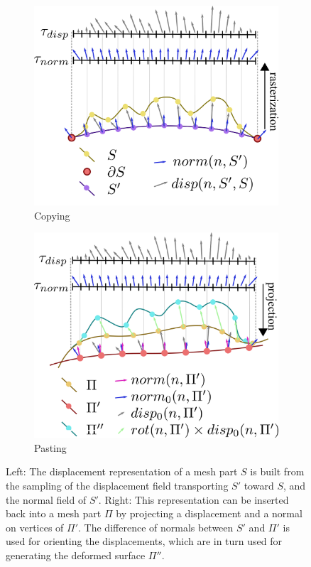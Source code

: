 \begin{figure}[!h]
	\centering
	\begin{subfigure}[b]{0.48\linewidth}
		\centering
		\includegraphics[width=\textwidth]{images/fluidsculpting-mig2016/displacement_copy_2.png}
		\caption{\label{fig:displacement:copy}Copying}
	\end{subfigure}
	\hspace{0.1cm}
	\begin{subfigure}[b]{0.48\linewidth}
		\centering
		\includegraphics[width=\textwidth]{images/fluidsculpting-mig2016/displacement_paste_2.png}
		\caption{\label{fig:displacement:insertion}Pasting}
	\end{subfigure}
	\caption[Fluid sculpting: Copy/Paste]{
		Left: The displacement representation of a mesh part $S$ is built from the sampling of the displacement field transporting $S'$ toward $S$, and the normal field of $S'$.
		Right: This representation can be inserted back into a mesh part $\Pi$ by projecting a displacement and a normal on vertices of $\Pi'$. 
		The difference of normals between $S'$ and $\Pi'$ is used for orienting the displacements, which are in turn used for generating the deformed surface $\Pi''$.
	}
	\label{fig:displacement}
\end{figure}
